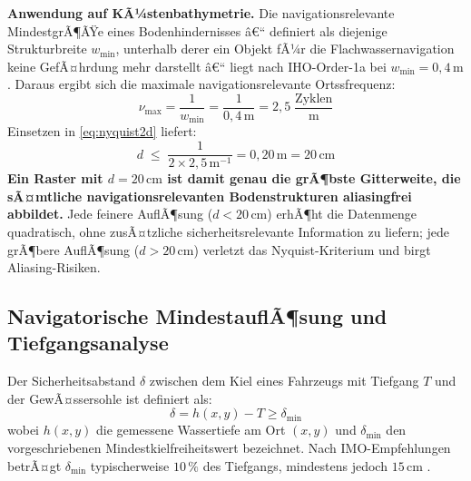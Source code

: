 ﻿\documentclass[a4paper,12pt]{article}
\theoremstyle{definition}
\begin{document}
\medskip\noindent
\textbf{Anwendung auf KÃ¼stenbathymetrie.}
Die navigationsrelevante MindestgrÃ¶ÃŸe eines Bodenhindernisses â€“ definiert als
diejenige Strukturbreite $w_{\min}$, unterhalb derer ein Objekt fÃ¼r die
Flachwassernavigation keine GefÃ¤hrdung mehr darstellt â€“ liegt nach
IHO-Order-1a bei $w_{\min} = 0{,}4\,\text{m}$ \cite{iho2020}.
Daraus ergibt sich die maximale navigationsrelevante Ortssfrequenz:
\begin{equation}
  \nu_{\max} = \frac{1}{w_{\min}} = \frac{1}{0{,}4\,\text{m}}
             = 2{,}5\;\frac{\text{Zyklen}}{\text{m}}
  \label{eq:numax}
\end{equation}
Einsetzen in \eqref{eq:nyquist2d} liefert:
\begin{equation}
  d \;\leq\; \frac{1}{2 \times 2{,}5\,\text{m}^{-1}}
             = 0{,}20\,\text{m} = 20\,\text{cm}
  \label{eq:dmax}
\end{equation}
\textbf{Ein Raster mit $d = 20\,\text{cm}$ ist damit genau die grÃ¶bste
Gitterweite, die sÃ¤mtliche navigationsrelevanten Bodenstrukturen
aliasingfrei abbildet.} Jede feinere AuflÃ¶sung ($d < 20\,\text{cm}$)
erhÃ¶ht die Datenmenge quadratisch, ohne zusÃ¤tzliche
sicherheitsrele\-vante Information zu liefern; jede grÃ¶bere
AuflÃ¶sung ($d > 20\,\text{cm}$) verletzt das Nyquist-Kriterium und
birgt Aliasing-Risiken.

\subsection{Navigatorische MindestauflÃ¶sung und Tiefgangsanalyse}

Der Sicherheitsabstand $\delta$ zwischen dem Kiel eines Fahrzeugs mit
Tiefgang $T$ und der GewÃ¤ssersohle ist definiert als:
\begin{equation}
  \delta = h(x,y) - T \geq \delta_{\min}
  \label{eq:kielfreiheit}
\end{equation}
wobei $h(x,y)$ die gemessene Wassertiefe am Ort $(x,y)$ und $\delta_{\min}$
den vorgeschriebenen Mindestkielfreiheitswert bezeichnet. Nach IMO-Empfehlungen
betrÃ¤gt $\delta_{\min}$ typischerweise $10\,\%$ des Tiefgangs, mindestens
jedoch $15\,\text{cm}$ \cite{imomsccircularnav}.
\end{document}
